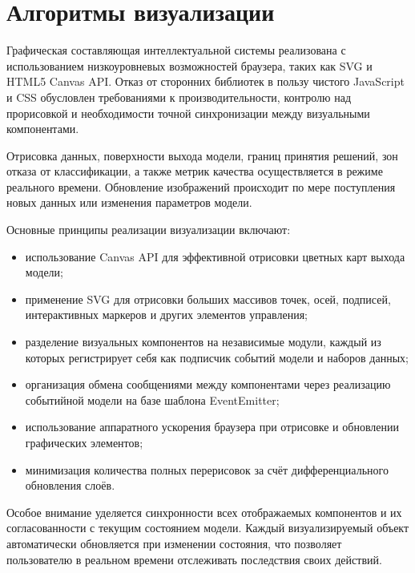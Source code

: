 \section{Алгоритмы визуализации}

Графическая составляющая интеллектуальной системы реализована с использованием низкоуровневых возможностей браузера, таких как SVG и HTML5 Canvas API. Отказ от сторонних библиотек в пользу чистого JavaScript и CSS обусловлен требованиями к производительности, контролю над прорисовкой и необходимости точной синхронизации между визуальными компонентами.

Отрисовка данных, поверхности выхода модели, границ принятия решений, зон отказа от классификации, а также метрик качества осуществляется в режиме реального времени. Обновление изображений происходит по мере поступления новых данных или изменения параметров модели.

Основные принципы реализации визуализации включают:

\begin{itemize}
    \item использование Canvas API для эффективной отрисовки цветных карт выхода модели;
    \item применение SVG для отрисовки больших массивов точек, осей, подписей, интерактивных маркеров и других элементов управления;
    \item разделение визуальных компонентов на независимые модули, каждый из которых регистрирует себя как подписчик событий модели и наборов данных;
    \item организация обмена сообщениями между компонентами через реализацию событийной модели на базе шаблона EventEmitter;
    \item использование аппаратного ускорения браузера при отрисовке и обновлении графических элементов;
    \item минимизация количества полных перерисовок за счёт дифференциального обновления слоёв.
\end{itemize}

Особое внимание уделяется синхронности всех отображаемых компонентов и их согласованности с текущим состоянием модели. Каждый визуализируемый объект автоматически обновляется при изменении состояния, что позволяет пользователю в реальном времени отслеживать последствия своих действий.
